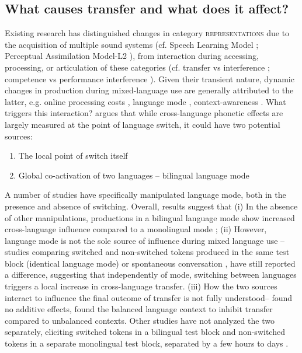 \documentclass[charis,linguex]{glossa}
\begin{document}
\subsection{What causes transfer and what does it affect?}\label{causes}

Existing research has distinguished changes in category \textsc{representations} due to the acquisition of multiple sound systems (cf. Speech Learning Model \citep{flege1995second,flege2007language}; Perceptual Assimilation Model-L2 \citep{best2007nonnative}), from interaction during accessing, processing, or articulation of these categories (cf. transfer vs interference \citep{grosjean2012attempt}; competence vs performance interference \citep{paradis1993linguistic}). 
Given their transient nature, dynamic changes in production during mixed-language use are generally attributed to the latter, e.g. online processing costs \citep{olson2013bilingual,tsui2019impact,vsimavckova2015immediate}, language mode \cite{simonet2014phonetic}, context-awareness \citep{khattab2013phonetic}. What triggers this interaction? \cite{olson2016role} argues that while cross-language phonetic effects are largely measured at the point of language switch, it could have two potential sources:
\begin{enumerate}
	\item The local point of switch itself
	\item Global co-activation of two languages -- bilingual language mode \citep{grosjean1998studying} 
\end{enumerate}

A number of studies have specifically manipulated language mode, both in the presence and absence of switching. Overall, results suggest that (i) In the absence of other manipulations, productions in a bilingual language mode show increased cross-language influence compared to a monolingual mode \citep{simonet2020increased,simonet2014phonetic}; (ii) However, language mode is not the sole source of influence during mixed language use -- studies comparing switched and non-switched tokens produced in the same test block (identical language mode) \citep{olson2016role,tsui2019impact} or spontaneous conversation \citep{piccinini2015voice}, have still reported a difference, suggesting that independently of mode, switching between languages triggers a local increase in cross-language transfer. (iii) How the two sources interact to influence the final outcome of transfer is not fully understood-- \cite{olson2016role} found no additive effects, \cite{olson2013bilingual} found the balanced language context to inhibit transfer compared to unbalanced contexts.  Other studies have not analyzed the two separately, eliciting switched tokens in a bilingual test block and non-switched tokens in a separate monolingual test block, separated by a few hours to days \cite{Pschwartz2015language, bullock2009trying,antoniou2011inter, elias2017effects,vsimavckova2015immediate,vsimavckova2018patterns}.
\end{document}
